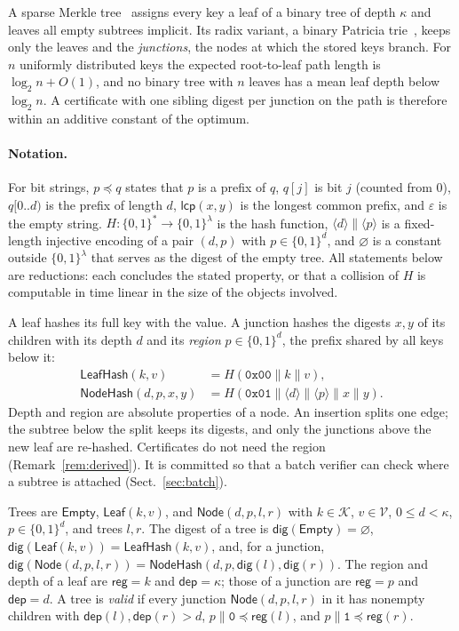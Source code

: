 \documentclass[runningheads]{llncs}
\newcommand{\LeafHash}{\mathsf{LeafHash}}
\newcommand{\NodeHash}{\mathsf{NodeHash}}
\newcommand{\dig}{\mathsf{dig}}
\newcommand{\Leaf}{\mathsf{Leaf}}
\newcommand{\Node}{\mathsf{Node}}
\newcommand{\Empty}{\mathsf{Empty}}
\newcommand{\reg}{\mathsf{reg}}
\newcommand{\dep}{\mathsf{dep}}
\newcommand{\lcp}{\mathsf{lcp}}
\newcommand{\cat}{\mathbin{\|}}
\newcommand{\K}{\mathcal{K}}
\newcommand{\V}{\mathcal{V}}
\newcommand{\bits}[1]{\texttt{#1}}
\begin{document}
A sparse Merkle tree~\cite{dahlberg2016smt} assigns every key a leaf of a binary tree of depth $\kappa$ and leaves all empty subtrees implicit. Its radix variant, a binary Patricia trie~\cite{morrison1968}, keeps only the leaves and the \emph{junctions}, the nodes at which the stored keys branch. For $n$ uniformly distributed keys the expected root-to-leaf path length is $\log_2 n + O(1)$, and no binary tree with $n$ leaves has a mean leaf depth below $\log_2 n$. A certificate with one sibling digest per junction on the path is therefore within an additive constant of the optimum.

\paragraph{Notation.} For bit strings, $p \preceq q$ states that $p$ is a prefix of $q$, $q[j]$ is bit $j$ (counted from $0$), $q[0..d)$ is the prefix of length $d$, $\lcp(x,y)$ is the longest common prefix, and $\varepsilon$ is the empty string. $H\colon \{0,1\}^* \to \{0,1\}^{\lambda}$ is the hash function, $\langle d\rangle \cat \langle p\rangle$ is a fixed-length injective encoding of a pair $(d,p)$ with $p \in \{0,1\}^{d}$, and $\varnothing$ is a constant outside $\{0,1\}^{\lambda}$ that serves as the digest of the empty tree. All statements below are reductions: each concludes the stated property, or that a collision of $H$ is computable in time linear in the size of the objects involved.

A leaf hashes its full key with the value. A junction hashes the digests $x, y$ of its children with its depth $d$ and its \emph{region} $p \in \{0,1\}^{d}$, the prefix shared by all keys below it:
\begin{align*}
  \LeafHash(k,v) &= H(\texttt{0x00} \cat k \cat v),\\
  \NodeHash(d,p,x,y) &= H(\texttt{0x01} \cat \langle d\rangle \cat \langle p\rangle \cat x \cat y).
\end{align*}
Depth and region are absolute properties of a node. An insertion splits one edge; the subtree below the split keeps its digests, and only the junctions above the new leaf are re-hashed. Certificates do not need the region (Remark~\ref{rem:derived}). It is committed so that a batch verifier can check where a subtree is attached (Sect.~\ref{sec:batch}).

\begin{definition}\label{def:tree}
Trees are $\Empty$, $\Leaf(k,v)$, and $\Node(d,p,l,r)$ with $k \in \K$, $v \in \V$, $0 \le d < \kappa$, $p \in \{0,1\}^{d}$, and trees $l, r$. The digest of a tree is $\dig(\Empty) = \varnothing$, $\dig(\Leaf(k,v)) = \LeafHash(k,v)$, and, for a junction, $\dig(\Node(d,p,l,r)) = \NodeHash(d,p,\dig(l),\dig(r))$. The region and depth of a leaf are $\reg = k$ and $\dep = \kappa$; those of a junction are $\reg = p$ and $\dep = d$. A tree is \emph{valid} if every junction $\Node(d,p,l,r)$ in it has nonempty children with $\dep(l), \dep(r) > d$, $p \cat \bits{0} \preceq \reg(l)$, and $p \cat \bits{1} \preceq \reg(r)$.
\end{definition}
\end{document}
